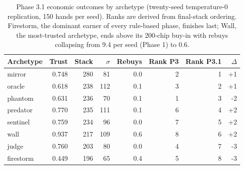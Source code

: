 \begin{table}[ht]
\centering
\small
\begin{tabular}{lrrrrrrr}
\hline
Archetype & Trust & Stack & $\sigma$ & Rebuys & Rank P3 & Rank P3.1 & $\Delta$ \\
\hline
mirror & 0.748 & 280 & 81 & 0.0 & 2 & 1 & +1 \\
oracle & 0.618 & 238 & 112 & 0.1 & 3 & 2 & +1 \\
phantom & 0.631 & 236 & 70 & 0.1 & 1 & 3 & -2 \\
predator & 0.770 & 235 & 111 & 0.1 & 6 & 4 & +2 \\
sentinel & 0.759 & 234 & 96 & 0.0 & 7 & 5 & +2 \\
wall & 0.937 & 217 & 109 & 0.6 & 8 & 6 & +2 \\
judge & 0.760 & 203 & 80 & 0.0 & 4 & 7 & -3 \\
firestorm & 0.449 & 196 & 65 & 0.4 & 5 & 8 & -3 \\
\hline
\end{tabular}
\caption{Phase 3.1 economic outcomes by archetype (twenty-seed temperature-0 replication, 150 hands per seed). Ranks are derived from final-stack ordering. Firestorm, the dominant earner of every rule-based phase, finishes last; Wall, the most-trusted archetype, ends above its 200-chip buy-in with rebuys collapsing from 9.4 per seed (Phase 1) to 0.6.}
\label{tab:archetype-p31}
\end{table}
